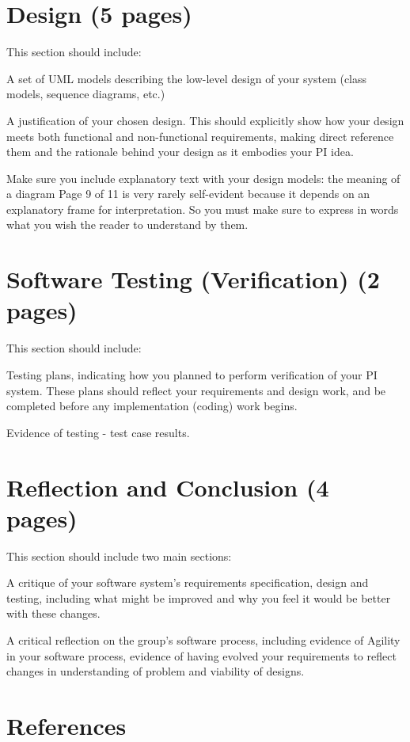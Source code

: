 \documentclass[12pt]{article}
\begin{document}
\section{Design (5 pages)}

This section should include:

A set of UML models describing the low-level design of your system (class models,
sequence diagrams, etc.)

A justification of your chosen design. This should explicitly show how your design
meets both functional and non-functional requirements, making direct reference
them and the rationale behind your design as it embodies your PI idea.

Make sure you include explanatory text with your design models: the meaning of a diagram
Page 9 of 11
is very rarely self-evident because it depends on an explanatory frame for interpretation. So
you must make sure to express in words what you wish the reader to understand by them.


\section{Software Testing (Verification) (2 pages)}

This section should include:

Testing plans, indicating how you planned to perform verification of your PI system.
These plans should reflect your requirements and design work, and be completed
before any implementation (coding) work begins.

Evidence of testing - test case results.


\section{Reflection and Conclusion (4 pages)}

This section should include two main sections:

A critique of your software system’s requirements specification, design and testing,
including what might be improved and why you feel it would be better with these
changes.

A critical reflection on the group’s software process, including evidence of Agility in
your software process, evidence of having evolved your requirements to reflect
changes in understanding of problem and viability of designs.


\section{References}
\end{document}
